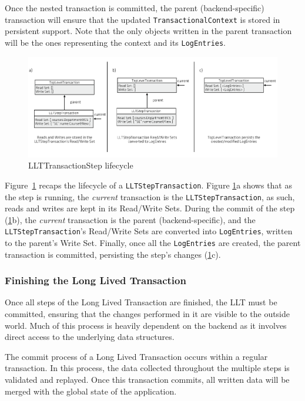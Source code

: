 \documentclass{llncs}
\begin{document}
Once the nested transaction is committed, the parent
(backend-specific) transaction will ensure that the updated
\texttt{TransactionalContext} is stored in persistent support. Note
that the only objects written in the parent transaction will be the
ones representing the context and its \texttt{LogEntries}.

\begin{figure}
\centering
\includegraphics[width=1\linewidth]{llt-step-lifecycle}
\caption{LLTTransactionStep lifecycle}
\label{fig:llt-lifecycle}
\end{figure}

Figure~\ref{fig:llt-lifecycle} recaps the lifecycle of a
\texttt{LLTStepTransaction}. Figure \ref{fig:llt-lifecycle}a shows
that as the step is running, the {\it current} transaction is the
\texttt{LLTStepTransaction}, as such, reads and writes are kept in its
Read/Write Sets. During the commit of the step
(\ref{fig:llt-lifecycle}b), the {\it current} transaction is the
parent (backend-specific), and the \texttt{LLTStepTransaction}'s
Read/Write Sets are converted into \texttt{LogEntries}, written to the
parent's Write Set. Finally, once all the \texttt{LogEntries} are
created, the parent transaction is committed, persisting the step's
changes (\ref{fig:llt-lifecycle}c).

\subsubsection{Finishing the Long Lived Transaction}
\label{sec:jvstm-commit}

Once all steps of the Long Lived Transaction are finished, the LLT
must be committed, ensuring that the changes performed in it are
visible to the outside world. Much of this process is heavily
dependent on the backend as it involves direct access to the
underlying data structures.

The commit process of a Long Lived Transaction occurs within a regular
transaction. In this process, the data collected throughout the
multiple steps is validated and replayed. Once this transaction
commits, all written data will be merged with the global state of the
application.
\end{document}
